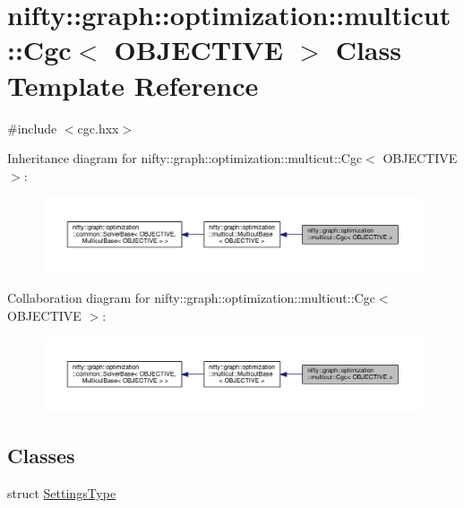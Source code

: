 \hypertarget{classnifty_1_1graph_1_1optimization_1_1multicut_1_1Cgc}{}\section{nifty\+:\+:graph\+:\+:optimization\+:\+:multicut\+:\+:Cgc$<$ O\+B\+J\+E\+C\+T\+I\+V\+E $>$ Class Template Reference}
\label{classnifty_1_1graph_1_1optimization_1_1multicut_1_1Cgc}


{\ttfamily \#include $<$cgc.\+hxx$>$}



Inheritance diagram for nifty\+:\+:graph\+:\+:optimization\+:\+:multicut\+:\+:Cgc$<$ O\+B\+J\+E\+C\+T\+I\+V\+E $>$\+:\nopagebreak
\begin{figure}[H]
\begin{center}
\leavevmode
\includegraphics[width=350pt]{classnifty_1_1graph_1_1optimization_1_1multicut_1_1Cgc__inherit__graph}
\end{center}
\end{figure}


Collaboration diagram for nifty\+:\+:graph\+:\+:optimization\+:\+:multicut\+:\+:Cgc$<$ O\+B\+J\+E\+C\+T\+I\+V\+E $>$\+:\nopagebreak
\begin{figure}[H]
\begin{center}
\leavevmode
\includegraphics[width=350pt]{classnifty_1_1graph_1_1optimization_1_1multicut_1_1Cgc__coll__graph}
\end{center}
\end{figure}
\subsection*{Classes}
\begin{DoxyCompactItemize}
\item 
struct \hyperlink{structnifty_1_1graph_1_1optimization_1_1multicut_1_1Cgc_1_1SettingsType}{Settings\+Type}
\end{DoxyCompactItemize}

